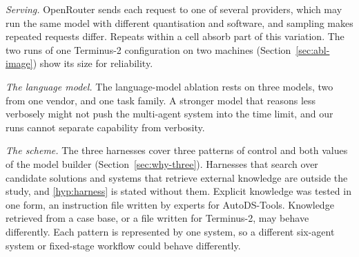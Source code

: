 \emph{Serving.} OpenRouter sends each request to one of several providers,
which may run the same model with different quantisation and software, and
sampling makes repeated requests differ. Repeats within a cell absorb part of
this variation. The two runs of one Terminus-2 configuration on two machines
(Section~\ref{sec:abl-image}) show its size for reliability.

\emph{The language model.} The language-model ablation rests on three
models, two from
one vendor, and one task family. A stronger model that reasons less
verbosely might not push the multi-agent system into the time limit, and
our runs cannot separate capability from verbosity.

\emph{The scheme.} The three harnesses cover three patterns of control and
both values of the model builder (Section~\ref{sec:why-three}). Harnesses
that search over candidate solutions and systems that retrieve external
knowledge are outside the study, and \ref{hyp:harness} is stated without
them. Explicit knowledge was tested in one form, an instruction file written
by experts for AutoDS-Tools. Knowledge retrieved from a case base, or a file
written for Terminus-2, may behave differently. Each pattern is represented by one system, so a different six-agent
system or fixed-stage workflow could behave differently.
